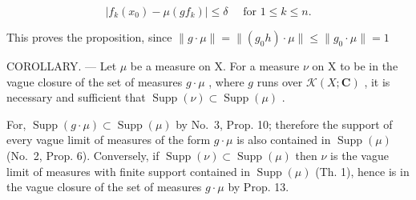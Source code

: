 \[
\left| f _ {k} \left(x _ {0}\right) - \mu \left(g f _ {k}\right) \right| \leqslant \delta \quad \text { for } 1 \leqslant k \leqslant n.
\]

This proves the proposition, since \(\| g\cdot \mu \| = \| (g_0h)\cdot \mu \| \leqslant \| g_0\cdot \mu \| = 1\)

COROLLARY. --- Let \(\mu\) be a measure on X. For a measure \(\nu\) on X to be in the vague closure of the set of measures \(g \cdot \mu\) , where \(g\) runs over \(\mathcal{K}(X; \mathbf{C})\) , it is necessary and sufficient that \(\operatorname{Supp}(\nu) \subset \operatorname{Supp}(\mu)\) .

For, \(\operatorname{Supp}(g\cdot\mu)\subset\operatorname{Supp}(\mu)\) by No.~3, Prop. 10; therefore the support of every vague limit of measures of the form \(g\cdot\mu\) is also contained in \(\operatorname{Supp}(\mu)\) (No.~2, Prop. 6). Conversely, if \(\operatorname{Supp}(\nu)\subset\operatorname{Supp}(\mu)\) then \(\nu\) is the vague limit of measures with finite support contained in \(\operatorname{Supp}(\mu)\) (Th. 1), hence is in the vague closure of the set of measures \(g\cdot\mu\) by Prop. 13.

